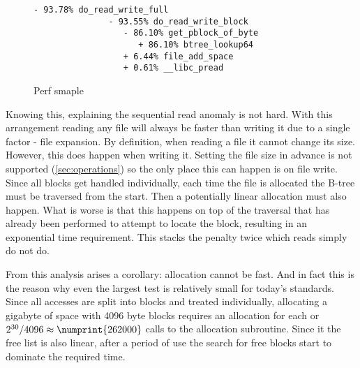         \begin{figure}[h]
            \caption{Perf smaple}
            \label{fig:perf_sample}
            \begin{lstlisting}[gobble=12]
            - 93.78% do_read_write_full
               - 93.55% do_read_write_block
                  - 86.10% get_pblock_of_byte
                     + 86.10% btree_lookup64
                  + 6.44% file_add_space
                  + 0.61% __libc_pread
            \end{lstlisting}
        \end{figure}

        Knowing this, explaining the sequential read anomaly is not hard. With
        this arrangement reading any file will always be faster than writing it
        due to a single factor - file expansion. By definition, when reading a
        file it cannot change its size. However, this does happen when writing
        it. Setting the file size in advance is not supported
        (\autoref{sec:operations}) so the only place this can happen is on file
        write. Since all blocks get handled individually, each time the file is
        allocated the B-tree must be traversed from the start. Then a
        potentially linear allocation must also happen. What is worse is that
        this happens on top of the traversal that has already been performed to
        attempt to locate the block, resulting in an exponential time
        requirement. This stacks the penalty twice which reads simply do not
        do.

        From this analysis arises a corollary: allocation cannot be fast. And
        in fact this is the reason why even the largest test is relatively
        small for today's standards. Since all accesses are split into blocks
        and treated individually, allocating a gigabyte of space with 4096 byte
        blocks requires an allocation for each or $2^{30} / 4096 \approx
        \numprint{262000}$ calls to the allocation subroutine. Since it the
        free list is also linear, after a period of use the search for free
        blocks start to dominate the required time.



